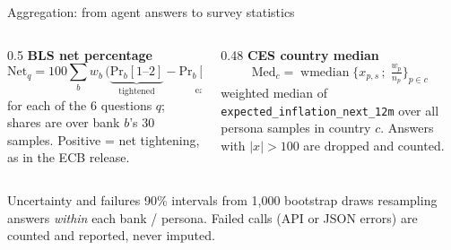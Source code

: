 \documentclass[aspectratio=169,10pt]{beamer}
\begin{document}
\begin{frame}{Aggregation: from agent answers to survey statistics}
  \begin{columns}[T]
    \begin{column}{0.5\textwidth}
      \textcolor{bank}{\textbf{BLS net percentage}}
      \[
        \text{Net}_q = 100 \sum_{b} w_b \,\Big(\underbrace{\mathrm{Pr}_b[1\text{--}2]}_{\text{tightened}}
                       - \underbrace{\mathrm{Pr}_b[4\text{--}5]}_{\text{eased}}\Big)
      \]
      for each of the 6 questions $q$; shares are over bank $b$'s 30 samples.
      Positive = net tightening, as in the ECB release.
    \end{column}
    \begin{column}{0.48\textwidth}
      \textcolor{hh}{\textbf{CES country median}}
      \[
        \text{Med}_c = \operatorname{wmedian}\big\{x_{p,s}\,;\; \tfrac{w_p}{n_p}\big\}_{p\in c}
      \]
      weighted median of \texttt{expected\_inflation\_next\_12m} over all persona samples in
      country $c$. Answers with $|x|>100$ are dropped and counted.
    \end{column}
  \end{columns}

  \vspace{5mm}
  \begin{block}{Uncertainty and failures}
    \footnotesize
    90\% intervals from 1{,}000 bootstrap draws resampling answers \emph{within} each bank / persona.
    Failed calls (API or JSON errors) are counted and reported, never imputed.
  \end{block}
\end{frame}
\end{document}
